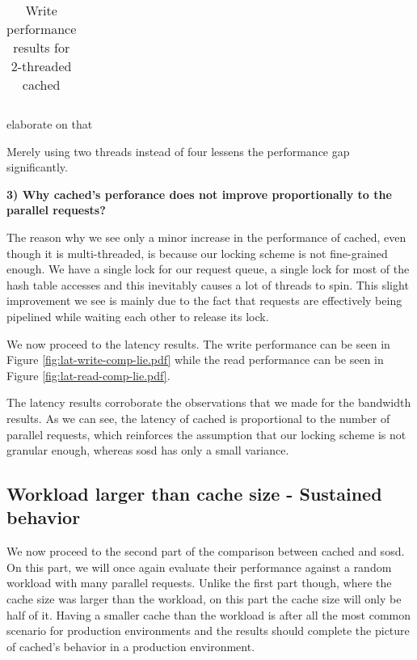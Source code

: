 \begin{table}[H]
	\centering
	\begin{tabular}{ | l | l | l | l | l |}
		\hline
		
	\end{tabular}
	\caption{Write performance results for 2-threaded cached}
	\label{tab:2threads}
\end{table}

\fixme elaborate on that

Merely using two threads instead of four lessens the performance gap 
significantly.

\textbf{3) Why cached's perforance does not improve proportionally to the 
	parallel requests?}

The reason why we see only a minor increase in the performance of cached, even 
though it is multi-threaded, is because our locking scheme is not fine-grained 
enough. We have a single lock for our request queue, a single lock for most of 
the hash table accesses and this inevitably causes a lot of threads to spin.  
This slight improvement we see is mainly due to the fact that requests are 
effectively being pipelined while waiting each other to release its lock.  

We now proceed to the latency results. The write performance can be seen in 
Figure \ref{fig:lat-write-comp-lie.pdf} while the read performance can be seen 
in Figure \ref{fig:lat-read-comp-lie.pdf}.


The latency results corroborate the observations that we made for the bandwidth 
results. As we can see, the latency of cached is proportional to the number of 
parallel requests, which reinforces the assumption that our locking scheme is 
not granular enough, whereas sosd has only a small variance.

\subsection{Workload larger than cache size - Sustained behavior}
\label{sec:sustained-plot}

We now proceed to the second part of the comparison between cached and sosd.  
On this part, we will once again evaluate their performance against a random 
workload with many parallel requests. Unlike the first part though, where the 
cache size was larger than the workload, on this part the cache size will
only be half of it. Having a smaller cache than the workload is after all the 
most common scenario for production environments and the results should 
complete the picture of cached's behavior in a production environment.

